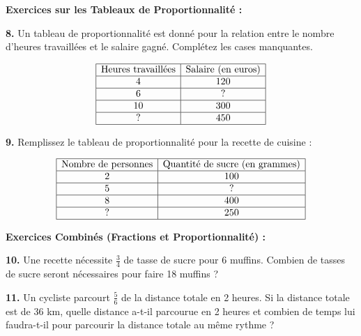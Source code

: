 \documentclass{article}
\begin{document}
    \begin{tcolorbox}[colback=yellow!10!white, colframe=yellow!75!black, title=\textcolor{white}{\textbf{Exercices}}, sharp corners=south, boxrule=0.8mm]
    
    \textbf{Exercices sur les Tableaux de Proportionnalité :}
    
    \vspace{5pt}
    
    \textbf{8.} Un tableau de proportionnalité est donné pour la relation entre le nombre d'heures travaillées et le salaire gagné. Complétez les cases manquantes.
    
    \[
    \begin{array}{|c|c|}
    \hline
    \text{Heures travaillées} & \text{Salaire (en euros)} \\
    \hline
    4 & 120 \\
    \hline
    6 & ? \\
    \hline
    10 & 300 \\
    \hline
    ? & 450 \\
    \hline
    \end{array}
    \]
    
    \vspace{10pt}
    
    \textbf{9.} Remplissez le tableau de proportionnalité pour la recette de cuisine :
    
    \[
    \begin{array}{|c|c|}
    \hline
    \text{Nombre de personnes} & \text{Quantité de sucre (en grammes)} \\
    \hline
    2 & 100 \\
    \hline
    5 & ? \\
    \hline
    8 & 400 \\
    \hline
    ? & 250 \\
    \hline
    \end{array}
    \]
    
    \vspace{20pt}
    
    \textbf{Exercices Combinés (Fractions et Proportionnalité) :}
    
    \vspace{5pt}
    
    \textbf{10.} Une recette nécessite \(\frac{3}{4}\) de tasse de sucre pour 6 muffins. Combien de tasses de sucre seront nécessaires pour faire 18 muffins ?
    
    \vspace{10pt}
    
    \textbf{11.} Un cycliste parcourt \(\frac{5}{6}\) de la distance totale en 2 heures. Si la distance totale est de 36 km, quelle distance a-t-il parcourue en 2 heures et combien de temps lui faudra-t-il pour parcourir la distance totale au même rythme ?
    
\end{tcolorbox}
\end{document}
